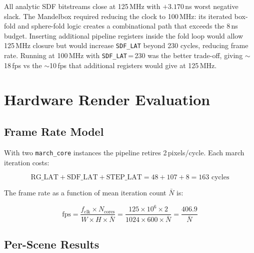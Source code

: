 All analytic SDF bitstreams close at 125\,MHz with $+3.170$\,ns worst
negative slack. The Mandelbox required reducing the clock to 100\,MHz: its
iterated box-fold and sphere-fold logic creates a combinational path that
exceeds the 8\,ns budget. Inserting additional pipeline registers inside the
fold loop would allow 125\,MHz closure but would increase \texttt{SDF\_LAT}
beyond 230 cycles, reducing frame rate. Running at 100\,MHz with
\texttt{SDF\_LAT}\,=\,230 was the better trade-off, giving $\sim$18\,fps
vs the $\sim$10\,fps that additional registers would give at 125\,MHz.

\section{Hardware Render Evaluation}
\label{sec:bench}

\subsection{Frame Rate Model}

With two \texttt{march\_core} instances the pipeline retires 2\,pixels/cycle.
Each march iteration costs:

\[
  \text{RG\_LAT} + \text{SDF\_LAT} + \text{STEP\_LAT} = 48 + 107 + 8 = 163\text{ cycles}
\]

The frame rate as a function of mean iteration count $\bar{N}$ is:

\begin{equation}
\text{fps} = \frac{f_\text{clk} \times N_\text{cores}}{W \times H \times \bar{N}}
           = \frac{125\times10^6 \times 2}{1024 \times 600 \times \bar{N}}
           = \frac{406.9}{\bar{N}}
\label{eq:fps}
\end{equation}

\subsection{Per-Scene Results}

